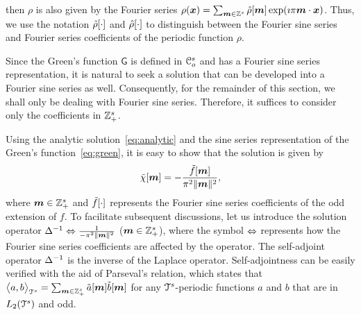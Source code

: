 then  $\rho$ is also given by the Fourier series
$
  \rho(\boldsymbol{x}) = \sum_{\boldsymbol{m} \in
    \mathbb{Z}^s} \hat{\rho}[\boldsymbol{m}] 
\exp(\imath \pi \boldsymbol{m} \cdot \boldsymbol{x})
$.
Thus, we use the notation $\tilde{\rho}[\cdot]$ and $\hat{\rho}[\cdot]$ to
distinguish between the Fourier sine series and Fourier series
coefficients of the periodic function $\rho$.

Since the Green's function $\mathsf{G}$ is defined in $\mathcal{C}_o^s$ and has a
Fourier sine series representation, it is natural to seek a solution
that can be developed into a Fourier sine series as
well. Consequently, for the remainder of this section, we shall only
be dealing with Fourier sine series. Therefore, it suffices to
consider only the coefficients in $\mathbb{Z}^s_+$.

Using the analytic solution~\eqref{eq:analytic} and the sine series
representation of the Green's function~\eqref{eq:green}, it is easy to show that
the solution is given by
\begin{equation}
  \st{\chi}[\vect{m}] = -
  \frac{\st{f}[\vect{m}]}{\pi^2 \norm{\vect{m}}^2},
\label{eq:fourierSolution}
\end{equation}
where $\boldsymbol{m} \in \mathbb{Z}^s_+$ and $\tilde{f}[\cdot]$ represents the Fourier
sine series coefficients of the odd extension of $f$. To facilitate subsequent
discussions, let us introduce the solution operator
$\mathop{\Delta^{-1}} \Leftrightarrow \frac{1}{-\pi^2 \lVert\boldsymbol{m}\rVert^2}$  ($\boldsymbol{m} \in
\mathbb{Z}^s_+$), where the symbol $\Leftrightarrow$ represents how the Fourier sine
series coefficients are affected by the operator.
The self-adjoint operator $\mathop{\Delta^{-1}}$ is the inverse of the Laplace
operator. Self-adjointness can be easily verified with
the aid of Parseval's relation, which states that
$
  \bigl \langle a , b \bigr \rangle_{\mathcal{T}^s} = \sum_{\boldsymbol{m} \in \mathbb{Z}^s_+} \tilde{a}[\boldsymbol{m}]
  \tilde{b}[\boldsymbol{m}] 
$
for any $\mathcal{T}^s$-periodic functions $a$ and $b$ that are in
$L_2(\mathcal{T}^s)$ and odd.



